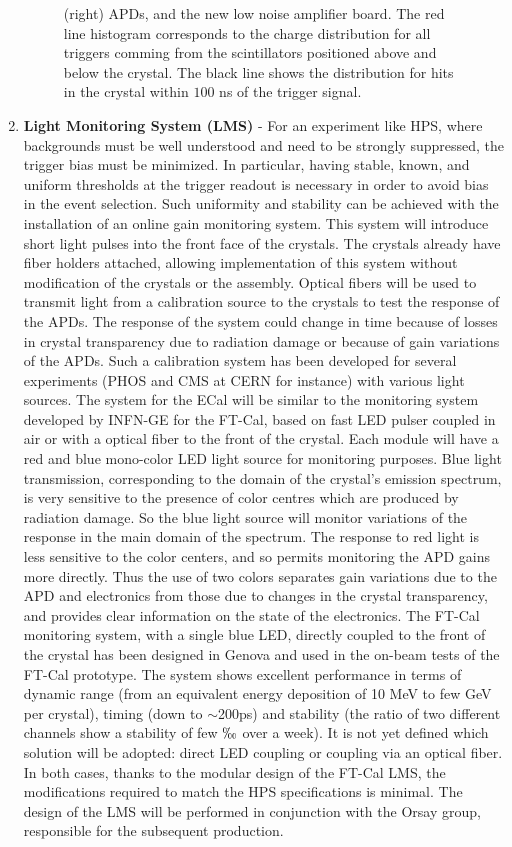 \documentclass[11pt]{report}
\begin{document}
\begin{enumerate}
\begin{figure*}[t]
{{(right) APDs, and the new low noise amplifier board. The red line histogram corresponds to the charge distribution for all triggers 
comming from the scintillators positioned above and below the crystal. The black line shows the distribution for hits in the crystal 
within $100$ ns of the trigger signal. }}\label{fig:mip10x10}
\end{figure*}
\item {\bf Light Monitoring System (LMS)} - For an experiment like HPS, where backgrounds must be well understood and need to be strongly suppressed, the trigger bias must be minimized. In particular, having stable, known, and uniform thresholds at the trigger readout is necessary in order to avoid  bias in the 
event selection. Such uniformity and stability can be achieved with the installation of an online gain monitoring 
system. This system will introduce short light pulses into the front face of the crystals. The crystals already have fiber holders attached, allowing implementation of this system without modification of  the crystals or the assembly. 
Optical fibers will be used to transmit light from a calibration  source to the crystals to test the response of the APDs. The response of the system could change in time because of 
losses in crystal transparency due to radiation damage or because of gain variations of the APDs. 
Such a calibration system has been developed for several experiments (PHOS and CMS at CERN for instance) with various light sources. The system for the ECal 
will be similar to the monitoring system developed by INFN-GE for the FT-Cal, based on fast LED pulser coupled in air or with a optical fiber to the front of the crystal.
Each module will have a red and blue mono-color LED light source for monitoring purposes. 
Blue light transmission, corresponding to the domain of the crystal's emission spectrum, is very sensitive to the presence of color centres which are produced by radiation damage. So the blue light source will monitor variations of the response in the main domain of the spectrum.
The response to red light is less sensitive to the color centers,  and so permits monitoring the APD gains more directly. Thus the use of two colors separates gain variations due to the 
APD and electronics from those due to changes in the crystal transparency, and provides clear information on the state of the electronics. 
The FT-Cal monitoring system, with a single blue LED, directly coupled to the front of the crystal has been designed in Genova and used in the on-beam tests of the  FT-Cal prototype.
The system shows excellent performance in terms of dynamic range (from an equivalent energy deposition of 10 MeV to few GeV per crystal), timing (down to $\sim$200ps)  and stability (the ratio of two different channels show a stability of few 
$\permil$ over a week). It is not yet defined which solution will be adopted: direct LED coupling or coupling via an optical fiber. In both cases,
thanks to the modular design of the FT-Cal LMS, the modifications required to match the HPS specifications is minimal.
 The design of the LMS will be performed in conjunction with the Orsay group, responsible for the subsequent production.
\end{enumerate}
\end{document}

